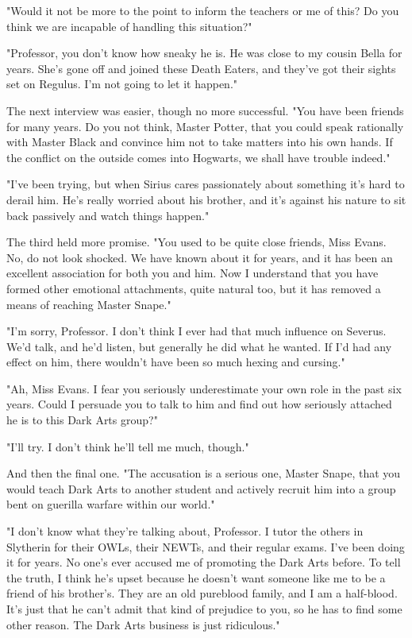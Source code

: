 "Would it not be more to the point to inform the teachers or me of this? Do you think we are incapable of handling this situation?"

"Professor, you don't know how sneaky he is. He was close to my cousin Bella for years. She's gone off and joined these Death Eaters, and they've got their sights set on Regulus. I'm not going to let it happen."

The next interview was easier, though no more successful. "You have been friends for many years. Do you not think, Master Potter, that you could speak rationally with Master Black and convince him not to take matters into his own hands. If the conflict on the outside comes into Hogwarts, we shall have trouble indeed."

"I've been trying, but when Sirius cares passionately about something it's hard to derail him. He's really worried about his brother, and it's against his nature to sit back passively and watch things happen."

The third held more promise. "You used to be quite close friends, Miss Evans. No, do not look shocked. We have known about it for years, and it has been an excellent association for both you and him. Now I understand that you have formed other emotional attachments, quite natural too, but it has removed a means of reaching Master Snape."

"I'm sorry, Professor. I don't think I ever had that much influence on Severus. We'd talk, and he'd listen, but generally he did what he wanted. If I'd had any effect on him, there wouldn't have been so much hexing and cursing."

"Ah, Miss Evans. I fear you seriously underestimate your own role in the past six years. Could I persuade you to talk to him and find out how seriously attached he is to this Dark Arts group?"

"I'll try. I don't think he'll tell me much, though."

And then the final one. "The accusation is a serious one, Master Snape, that you would teach Dark Arts to another student and actively recruit him into a group bent on guerilla warfare within our world."

"I don't know what they're talking about, Professor. I tutor the others in Slytherin for their OWLs, their NEWTs, and their regular exams. I've been doing it for years. No one's ever accused me of promoting the Dark Arts before. To tell the truth, I think he's upset because he doesn't want someone like me to be a friend of his brother's. They are an old pureblood family, and I am a half-blood. It's just that he can't admit that kind of prejudice to you, so he has to find some other reason. The Dark Arts business is just ridiculous."

